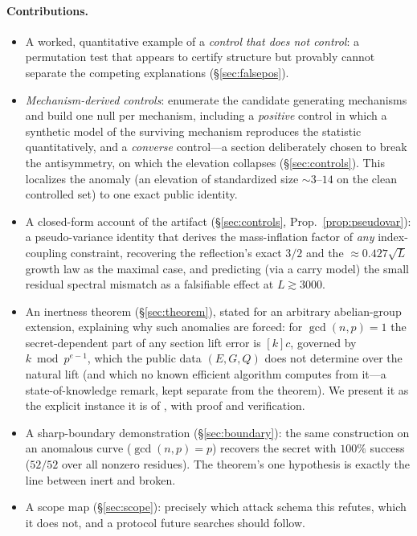 \documentclass[11pt]{article}
\theoremstyle{definition}
\begin{document}
\paragraph{Contributions.}
\begin{itemize}
\item A worked, quantitative example of a \emph{control that does not
control}: a permutation test that appears to certify structure but
provably cannot separate the competing explanations
(\S\ref{sec:falsepos}).
\item \emph{Mechanism-derived controls}: enumerate the candidate
generating mechanisms and build one null per mechanism, including a
\emph{positive} control in which a synthetic model of the surviving
mechanism reproduces the statistic quantitatively, and a \emph{converse}
control---a section deliberately chosen to break the antisymmetry, on
which the elevation collapses (\S\ref{sec:controls}). This localizes the
anomaly (an elevation of standardized size $\sim$$3$--$14$ on the clean
controlled set) to one exact public identity.
\item A closed-form account of the artifact (\S\ref{sec:controls},
Prop.~\ref{prop:pseudovar}): a pseudo-variance identity that derives the
mass-inflation factor of \emph{any} index-coupling constraint, recovering
the reflection's exact $3/2$ and the $\approx0.427\sqrt L$ growth law as
the maximal case, and predicting (via a carry model) the small residual
spectral mismatch as a falsifiable effect at $L\gtrsim 3000$.
\item An inertness theorem (\S\ref{sec:theorem}), stated for an arbitrary
abelian-group extension, explaining why such anomalies are forced: for
$\gcd(n,p)=1$ the secret-dependent part of any section lift error is
$[k]c$, governed by $k \bmod p^{e-1}$, which the public data $(E,G,Q)$
does not determine over the natural lift (and which no known efficient
algorithm computes from it---a state-of-knowledge remark, kept separate
from the theorem). We present it as the explicit instance it is of
\cite{silvermanlift,gadiyarpadma}, with proof and verification.
\item A sharp-boundary demonstration (\S\ref{sec:boundary}): the same
construction on an anomalous curve ($\gcd(n,p)=p$) recovers the secret
with $100\%$ success ($52/52$ over all nonzero residues). The theorem's
one hypothesis is exactly the line between inert and broken.
\item A scope map (\S\ref{sec:scope}): precisely which attack schema this
refutes, which it does not, and a protocol future searches should follow.
\end{itemize}
\end{document}
